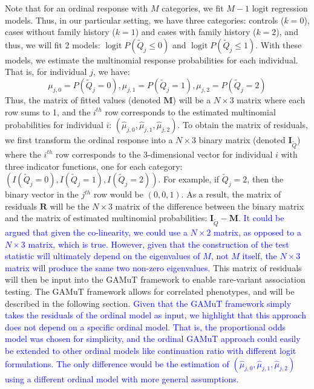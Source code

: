 \documentclass[]{article}
\DeclareMathOperator{\logit}{logit}
\theoremstyle{definition}
\theoremstyle{definition}
\theoremstyle{definition}
\theoremstyle{remark}
\begin{document}
Note that for an ordinal response with \(M\) categories, we fit \(M-1\)
logit regression models. Thus, in our particular setting, we have three
categories: controls (\(k=0\)), cases without family history (\(k=1\))
and cases with family history (\(k=2\)), and thus, we will fit 2 models:
\(\logit P(\tilde{Q}_j \leq 0)\) and \(\logit P(\tilde{Q}_j \leq 1)\).
With these models, we estimate the multinomial response probabilities
for each individual. That is, for individual \(j\), we have: \[
\mu_{j,0} = P(\tilde{Q}_j=0),
\mu_{j,1} = P(\tilde{Q}_j=1),
\mu_{j,2} = P(\tilde{Q}_j=2)
\] Thus, the matrix of fitted values (denoted \(\mathbf{M}\)) will be a
\(N \times 3\) matrix where each row sums to 1, and the \(i^{th}\) row
corresponds to the estimated multinomial probabilities for individual
\(i\): \((\hat{\mu}_{j,0},\hat{\mu}_{j,1},\hat{\mu}_{j,2})\). To obtain
the matrix of residuals, we first transform the ordinal response into a
\(N \times 3\) binary matrix (denoted \(\mathbf{I}_{\tilde{Q}}\)) where
the \(i^{th}\) row corresponds to the 3-dimensional vector for
individual \(i\) with three indicator functions, one for each category:
\((I(\tilde{Q}_j=0), I(\tilde{Q}_j=1), I(\tilde{Q}_j=2))\). For example,
if \(\tilde{Q}_j=2\), then the binary vector in the \(j^{th}\) row would
be \((0,0,1)\). As a result, the matrix of residuals \(\mathbf{R}\) will
be the \(N \times 3\) matrix of the difference between the binary matrix
and the matrix of estimated multinomial probabilities:
\(\mathbf{I}_{\tilde{Q}}-\mathbf{M}\).
\textcolor{blue}{It could be argued that given the co-linearity, we could use a $N \times 2$ matrix, as opposed to a $N \times 3$ matrix, which is true. However, given that the construction of the test statistic will ultimately depend on the eigenvalues of $M$, not $M$ itself, the $N \times 3$ matrix will produce the same two non-zero eigenvalues.}
This matrix of residuals will then be input into the GAMuT framework to
enable rare-variant association testing. The GAMuT framework allows for
correlated phenotypes, and will be described in the following section.
\textcolor{blue}{Given that the GAMuT framework simply takes the residuals of the ordinal model as input, we highlight that this approach does not depend on a specific ordinal model. That is, 
the proportional odds model was chosen for simplicity, and the ordinal GAMuT approach could easily be extended to other ordinal models like continuation ratio with different logit formulations. The only difference would be the estimation of $(\hat{\mu}_{j,0},\hat{\mu}_{j,1},\hat{\mu}_{j,2})$ using a different ordinal model with more general assumptions.}
\end{document}

